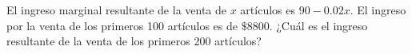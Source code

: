 \item El ingreso marginal resultante de la venta de $x$ artículos es $90 - 0.02x$. El ingreso por la venta de los primeros 100 artículos es de $\$8800$. ¿Cuál es el ingreso resultante de la venta de los primeros 200 artículos?
